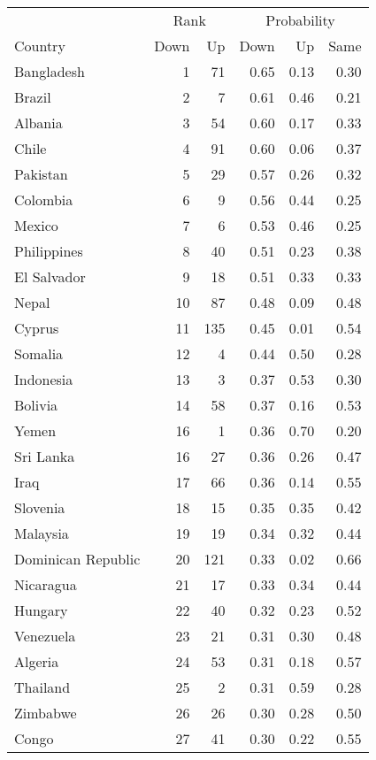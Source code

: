 
\begin{longtable}[t]{lrrrrr}
\toprule
\multicolumn{1}{c}{ } & \multicolumn{2}{c}{Rank} & \multicolumn{3}{c}{Probability} \\
\cmidrule(l{3pt}r{3pt}){2-3} \cmidrule(l{3pt}r{3pt}){4-6}
Country & Down & Up & Down & Up & Same\\
\midrule
Bangladesh & 1 & 71 & 0.65 & 0.13 & 0.30\\
Brazil & 2 & 7 & 0.61 & 0.46 & 0.21\\
Albania & 3 & 54 & 0.60 & 0.17 & 0.33\\
Chile & 4 & 91 & 0.60 & 0.06 & 0.37\\
Pakistan & 5 & 29 & 0.57 & 0.26 & 0.32\\
\addlinespace
Colombia & 6 & 9 & 0.56 & 0.44 & 0.25\\
Mexico & 7 & 6 & 0.53 & 0.46 & 0.25\\
Philippines & 8 & 40 & 0.51 & 0.23 & 0.38\\
El Salvador & 9 & 18 & 0.51 & 0.33 & 0.33\\
Nepal & 10 & 87 & 0.48 & 0.09 & 0.48\\
\addlinespace
Cyprus & 11 & 135 & 0.45 & 0.01 & 0.54\\
Somalia & 12 & 4 & 0.44 & 0.50 & 0.28\\
Indonesia & 13 & 3 & 0.37 & 0.53 & 0.30\\
Bolivia & 14 & 58 & 0.37 & 0.16 & 0.53\\
Yemen & 16 & 1 & 0.36 & 0.70 & 0.20\\
\addlinespace
Sri Lanka & 16 & 27 & 0.36 & 0.26 & 0.47\\
Iraq & 17 & 66 & 0.36 & 0.14 & 0.55\\
Slovenia & 18 & 15 & 0.35 & 0.35 & 0.42\\
Malaysia & 19 & 19 & 0.34 & 0.32 & 0.44\\
Dominican Republic & 20 & 121 & 0.33 & 0.02 & 0.66\\
\addlinespace
Nicaragua & 21 & 17 & 0.33 & 0.34 & 0.44\\
Hungary & 22 & 40 & 0.32 & 0.23 & 0.52\\
Venezuela & 23 & 21 & 0.31 & 0.30 & 0.48\\
Algeria & 24 & 53 & 0.31 & 0.18 & 0.57\\
Thailand & 25 & 2 & 0.31 & 0.59 & 0.28\\
\addlinespace
Zimbabwe & 26 & 26 & 0.30 & 0.28 & 0.50\\
Congo & 27 & 41 & 0.30 & 0.22 & 0.55\\

\end{longtable}
